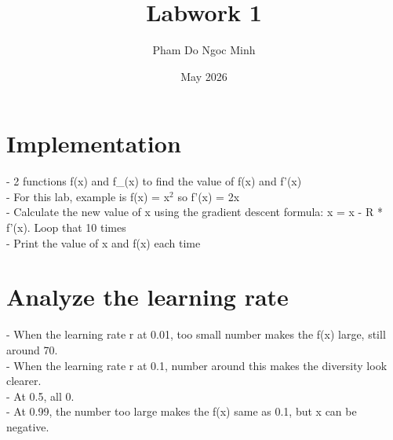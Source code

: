 \documentclass{article}
\title{Labwork 1}
\author{Pham Do Ngoc Minh}
\date{May 2026}
\begin{document}
\maketitle

\section{Implementation}
- 2 functions f(x) and f\_(x) to find the value of f(x) and f'(x)
\\
- For this lab, example is f(x) = x$^2$ so f'(x) = 2x
\\
- Calculate the new value of x using the gradient descent formula: x = x - R *
f’(x). Loop that 10 times
\\
- Print the value of x and f(x) each time


\section{Analyze the learning rate}
- When the learning rate r at 0.01, too small number makes the f(x) large, still around 70.
\\
- When the learning rate r at 0.1, number around this makes the diversity look clearer.
\\
- At 0.5, all 0.
\\
- At 0.99, the number too large makes the f(x) same as 0.1, but x can be negative.
\end{document}
